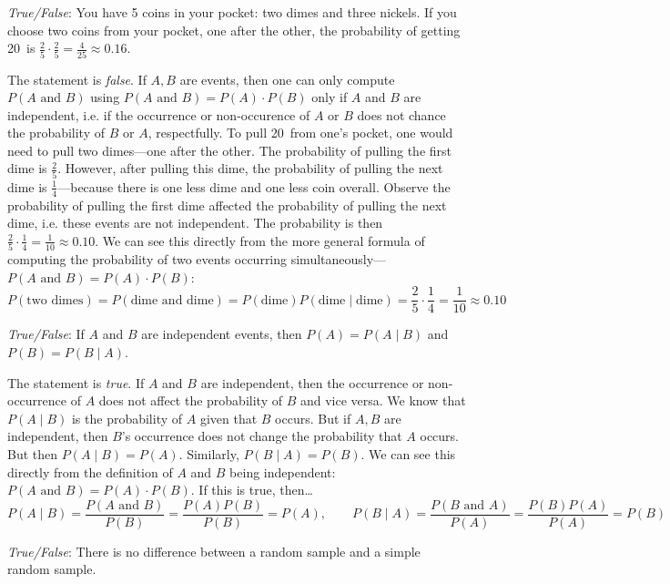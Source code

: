 \documentclass[11pt,letterpaper]{article}
\begin{document}
\quizsol \textit{True/False}: You have 5 coins in your pocket: two dimes and three nickels. If you choose two coins from your pocket, one after the other, the probability of getting 20\textcent\ is $\frac{2}{5} \cdot \frac{2}{5}= \frac{4}{25} \approx 0.16$. \pspace

\sol The statement is \textit{false}. If $A, B$ are events, then one can only compute $P(A \text{ and } B)$ using $P(A \text{ and } B)= P(A) \cdot P(B)$ only if $A$ and $B$ are independent, i.e. if the occurrence or non-occurence of $A$ or $B$ does not chance the probability of $B$ or $A$, respectfully. To pull 20\textcent\ from one's pocket, one would need to pull two dimes---one after the other. The probability of pulling the first dime is $\frac{2}{5}$. However, after pulling this dime, the probability of pulling the next dime is $\frac{1}{4}$---because there is one less dime and one less coin overall. Observe the probability of pulling the first dime affected the probability of pulling the next dime, i.e. these events are not independent. The probability is then $\frac{2}{5} \cdot \frac{1}{4}= \frac{1}{10} \approx 0.10$. We can see this directly from the more general formula of computing the probability of two events occurring simultaneously---$P(A \text{ and } B)= P(A) \cdot P(B)$:
	\[
	P(\text{two dimes})= P(\text{dime and dime})= P(\text{dime}) P( \text{dime} \;|\; \text{dime})= \dfrac{2}{5} \cdot \dfrac{1}{4}= \dfrac{1}{10} \approx 0.10
	\] \pvspace{1.3cm}



\quizsol \textit{True/False}: If $A$ and $B$ are independent events, then $P(A)= P(A \;|\; B)$ and $P(B)= P(B \;|\; A)$. \pspace

\sol The statement is \textit{true}. If $A$ and $B$ are independent, then the occurrence or non-occurrence of $A$ does not affect the probability of $B$ and vice versa. We know that $P(A \;|\; B)$ is the probability of $A$ given that $B$ occurs. But if $A, B$ are independent, then $B$'s occurrence does not change the probability that $A$ occurs. But then $P(A \;|\; B)= P(A)$. Similarly, $P(B \;|\; A)= P(B)$. We can see this directly from the definition of $A$ and $B$ being independent: $P(A \text{ and } B)= P(A) \cdot P(B)$. If this is true, then\dots
	\[
	P(A \;|\; B)= \dfrac{P(A \text{ and } B)}{P(B)}= \dfrac{P(A) P(B)}{P(B)}= P(A), \qquad P(B \;|\; A)= \dfrac{P(B \text{ and } A)}{P(A)}= \dfrac{P(B) P(A)}{P(A)}= P(B)
	\] \pvspace{1.3cm}



\quizsol \textit{True/False}: There is no difference between a random sample and a simple random sample. \pspace
\end{document}

